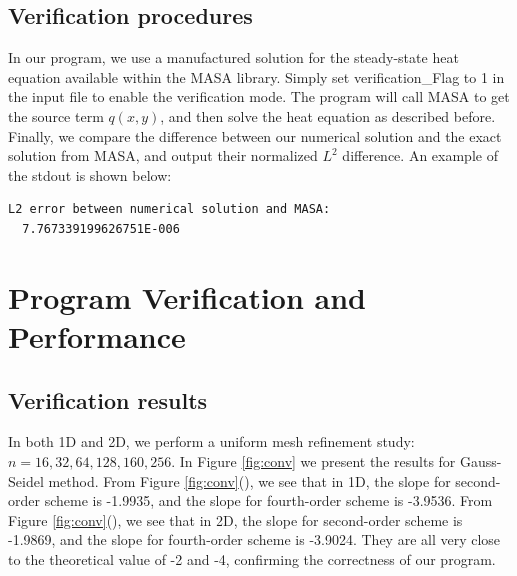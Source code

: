 \documentclass{article}
\begin{document}
\subsection{Verification procedures}
In our program, we use a manufactured solution for the steady-state heat equation available within the 
MASA library. Simply set verification\_Flag to 1 in the input file to enable the verification mode.
The program will call MASA to get the source term $q(x,y)$, and then solve the heat equation as described
before. Finally, we compare the difference between our numerical solution and the exact solution from MASA, 
and output their normalized $L^2$ difference. An example of the stdout is shown below:

\begin{verbatim}
L2 error between numerical solution and MASA: 
  7.767339199626751E-006
\end{verbatim}


\section{Program Verification and Performance}

\subsection{Verification results}
In both 1D and 2D, we perform a uniform mesh refinement study: $n = 16, 32, 64, 128, 160, 256$. In Figure
\ref{fig:conv} we present the results for Gauss-Seidel method. From Figure \ref{fig:conv}(),
we see that in 1D, the slope for second-order scheme is -1.9935, and the slope for fourth-order scheme is
-3.9536. From Figure \ref{fig:conv}(), we see that in 2D, the slope for second-order scheme
is -1.9869, and the slope for fourth-order scheme is -3.9024. They are all very close to the theoretical
value of -2 and -4, confirming the correctness of our program.
\end{document}
